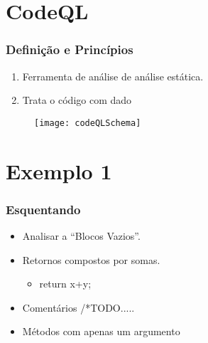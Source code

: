\documentclass[10pt, aspectratio=169]{beamer}
\begin{document}
\section{CodeQL}
\begin{frame}
  \frametitle{Definição e Princípios} 

  \begin{enumerate}
  \item \vfill Ferramenta de análise de análise estática.
  \item \vfill Trata o código com dado
  \end{enumerate}
\begin{figure} 
	
	\texttt{[image: codeQLSchema]}

\end{figure}
	
 


\end{frame}


\section{Exemplo 1}
\begin{frame}
	\frametitle{Esquentando}
	  \begin{itemize}
		\item  Analisar a ``Blocos Vazios''.
		\item  Retornos compostos por somas.
		\begin{itemize}
			\item return x+y;	
		\end{itemize}
		\item Comentários /*TODO.....
		\item Métodos com apenas um argumento
		
	\end{itemize}
	
	
	
\end{frame}
\end{document}
